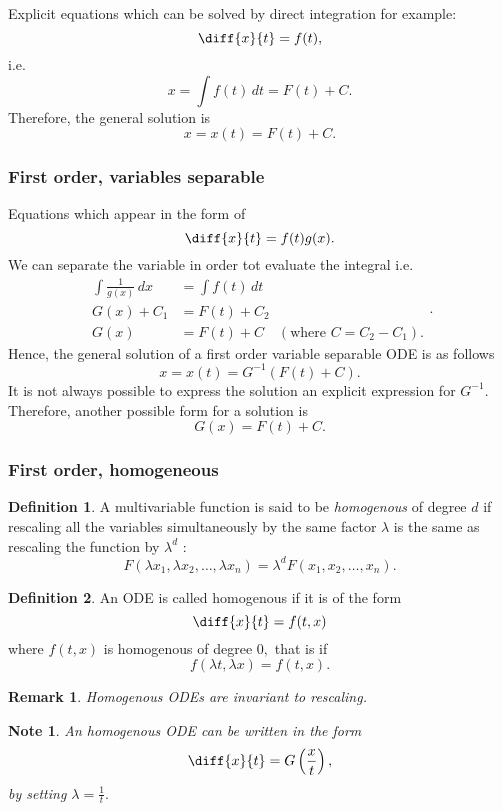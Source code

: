 \documentclass[12pt, a4paper]{article}
\newcommand{\f}[2]{\frac{#1}{#2}}
\newtheorem*{remark}{Remark}
\newtheorem*{note}{Note}
\theoremstyle{definition}
\newtheorem{definition}{Definition}[section]
\theoremstyle{plain}
\begin{document}
Explicit equations which can be solved by direct integration for example: $$\diff{x}{t} = f(t),$$ i.e. $$ x = \int f(t) \, dt = F(t)+C.$$ Therefore, the general solution is $$x= x(t) = F(t)+C.$$

\subsubsection{First order, variables separable}

Equations which appear in the form of $$\diff{x}{t}=f(t)g(x).$$ We can separate the variable in order tot evaluate the integral i.e. $$\begin{aligned}
\int \f{1}{g(x)} \, dx &= \int f(t) \, dt \\
G(x)+C_1&=F(t)+C_2 \\
G(x) &= F(t) +C \quad (\text{where } C=C_2-C_1).
\end{aligned}.$$ Hence, the general solution of a first order variable separable ODE is as follows $$x=x(t)=G^{-1}(F(t)+C).$$ It is not always possible to express the solution an explicit expression for $G^{-1}.$ Therefore, another possible form for a solution is $$G(x)=F(t)+C.$$

\subsubsection{First order, homogeneous}

\begin{definition}
A multivariable function is said to be \textit{homogenous} of degree $d$ if rescaling all the variables simultaneously by the same factor $\lambda$ is the same as rescaling the function by $\lambda^d$ :$$F(\lambda x_1,\lambda x_2,\ldots,\lambda x_n) = \lambda^d F(x_1,x_2,\ldots,x_n).$$
\end{definition}

\begin{definition}
An ODE is called homogenous if it is of the form $$\diff{x}{t}=f(t,x)$$ where $f(t,x)$ is homogenous of degree $0,$ that is if $$f(\lambda t,\lambda x) = f(t,x).$$
\end{definition}

\begin{remark}
Homogenous ODEs are invariant to rescaling.
\end{remark}

\begin{note}
An homogenous ODE can be written in the form $$\diff{x}{t}= G\left(\f{x}{t}\right),$$ by setting $\lambda = \f{1}{t}.$
\end{note}
\end{document}
